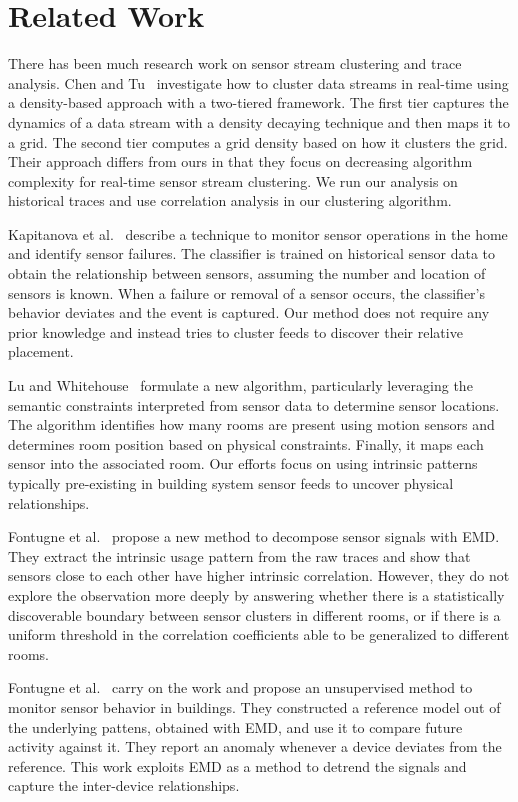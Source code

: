 \section{Related Work}
\label{sec:related}

There has been much research work on sensor stream clustering and trace analysis. Chen and Tu~\cite{DStream} investigate 
how to cluster data streams in real-time using a density-based approach with a two-tiered framework. The first tier captures 
the dynamics of a data stream with a density decaying technique and then maps it to a grid.  The second tier computes a grid 
density based on how it clusters the grid. Their approach differs from ours in that they focus on decreasing algorithm 
complexity for real-time sensor stream clustering.  We run our analysis on historical traces and use correlation analysis
in our clustering algorithm.

Kapitanova et al.~\cite{failure} describe a technique to monitor sensor operations in the home and identify sensor failures. 
The classifier is trained on historical sensor data to obtain the relationship between sensors, assuming the number and location of 
sensors is known.  When a failure or removal of a sensor occurs, the classifier's behavior deviates and the event is captured. Our method does not require any prior knowledge and instead tries to cluster feeds to discover their relative placement.

Lu and Whitehouse~\cite{blueprints} formulate a new algorithm, particularly leveraging the semantic constraints interpreted from sensor 
data to determine sensor locations. The algorithm identifies how many rooms are present using motion sensors and determines room position based on physical constraints. Finally, it maps each sensor into the associated room. Our efforts focus on using intrinsic patterns typically pre-existing in building system sensor feeds to uncover physical relationships.

Fontugne et al.~\cite{IOT} propose a new method to decompose sensor signals with EMD.
They extract the intrinsic usage pattern from the raw traces and show that sensors close to each other have higher intrinsic correlation. However, they do not explore the observation more deeply by answering whether there is a statistically discoverable boundary between sensor clusters in different rooms, or if there is a uniform threshold in the correlation coefficients able to be generalized to different rooms.

Fontugne et al.~\cite{SBS} carry on the work and propose an unsupervised method to monitor sensor behavior in buildings. They constructed 
a reference model out of the underlying pattens, obtained with EMD,  and use it to compare future activity against it.  They report an anomaly whenever a device deviates from the reference. This work exploits EMD as a method to detrend the signals and capture the inter-device relationships.


